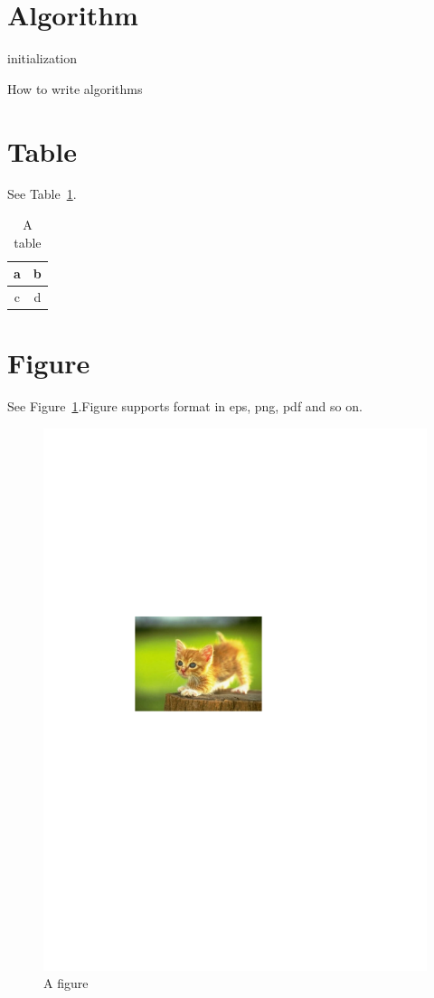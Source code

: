 \documentclass[degree=bachelor]{hustthesis-en}
\begin{document}
\section{Algorithm}

\begin{algorithm}[H]
\SetAlgoLined
{}
initialization\;
\caption{How to write algorithms}
\end{algorithm}

\section{Table}
See Table~\ref{tab:1}.

\begin{table}[ht]
\centering
\caption{A table}\label{tab:1}
\begin{tabular}{|c|c|}
\hline
a & b \\
\hline
c & d \\
\hline
\end{tabular}
\end{table}

\section{Figure}
See Figure~\ref{fig:1}.Figure supports format in eps, png, pdf and so on.

\begin{figure}[hb]
\centering
\includegraphics[width=.8\textwidth]{fig-example.pdf}
\caption{A figure}\label{fig:1}
\end{figure}
\end{document}
